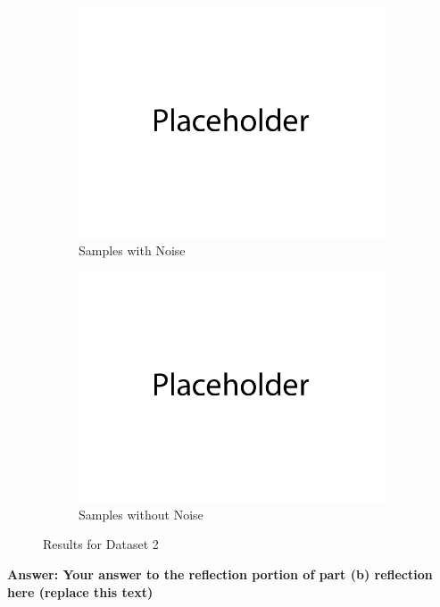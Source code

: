 \documentclass{article}
\begin{document}
\begin{enumerate}[(a)]
\begin{figure}[H]
\begin{subfigure}{0.32\textwidth}
        \includegraphics[width=\textwidth]{figures/q1_b_dset2_sample_with_noise.png}
        \caption{Samples with Noise}
    \end{subfigure}
    \begin{subfigure}{0.32\textwidth}
        \centering
        \includegraphics[width=\textwidth]{figures/q1_b_dset2_sample_without_noise.png}
        \caption{Samples without Noise}
    \end{subfigure}
    \caption{Results for Dataset 2}
\end{figure}
\textbf{Answer: Your answer to the reflection portion of part (b) reflection here (replace this text)}
\end{enumerate}
\end{document}
